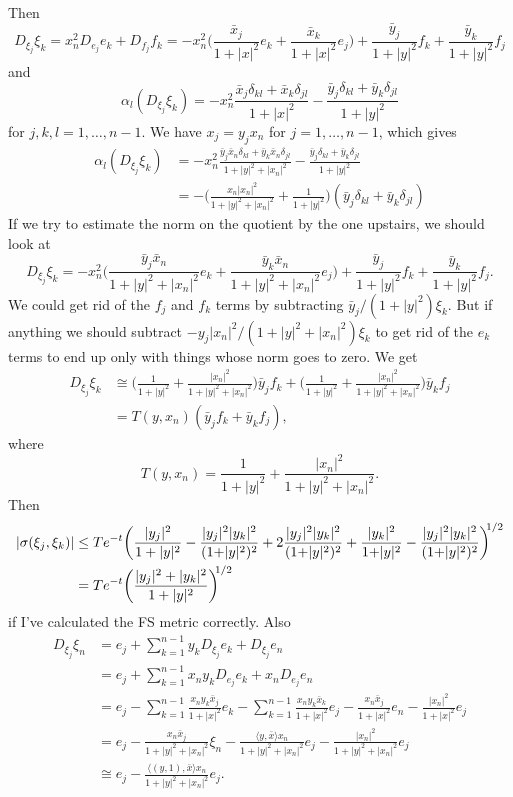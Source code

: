 \documentclass[10pt,a4paper]{amsart}
\def\<{\langle}
\def\>{\rangle}
\begin{document}
Then
$$
D_{\xi_j} \xi_k
= x_n^2 D_{e_j} e_k + D_{f_j} f_k
= -x_n^2
\biggl(
\frac{\bar x_j}{1+|x|^2} e_k
+ \frac{\bar x_k}{1+|x|^2} e_j
\biggr)
+ \frac{\bar y_j}{1+|y|^2} f_k + \frac{\bar y_k}{1+|y|^2} f_j
$$
and
$$
\alpha_l(D_{\xi_j}\xi_k)
= -x_n^2
\frac{\bar x_j \delta_{kl} + \bar x_k \delta_{jl}}{1+|x|^2}
- \frac{\bar y_j \delta_{kl} + \bar y_k \delta_{jl}}{1+|y|^2}
$$
for $j,k,l = 1, \ldots, n-1$.
We have $x_j = y_j x_n$ for $j=1,\ldots,n-1$, which gives
\begin{align*}
\alpha_l(D_{\xi_j}\xi_k)
&= -x_n^2
\frac{\bar y_j \bar x_n \delta_{kl} + \bar y_k \bar x_n \delta_{jl}}{1+|y|^2+|x_n|^2}
- \frac{\bar y_j \delta_{kl} + \bar y_k \delta_{jl}}{1+|y|^2}
\\
&= -
\biggl(
\frac{x_n |x_n|^2}{1+|y|^2+|x_n|^2}
+ \frac{1}{1+|y|^2}
\biggr)(\bar y_j \delta_{kl} + \bar y_k \delta_{jl})
\end{align*}
If we try to estimate the norm on the quotient by the one upstairs, we
should look at
$$
D_{\xi_j} \xi_k
=  -x_n^2
\biggl(
\frac{\bar y_j \bar x_n}{1+|y|^2+|x_n|^2} e_k
+ \frac{\bar y_k \bar x_n}{1+|y|^2+|x_n|^2} e_j
\biggr)
+ \frac{\bar y_j}{1+|y|^2} f_k + \frac{\bar y_k}{1+|y|^2} f_j.
$$
We could get rid of the $f_j$ and $f_k$ terms by subtracting $\bar y_j / (1+|y|^2) \xi_k$.
But if anything we should subtract $-y_j|x_n|^2/(1+|y|^2+|x_n|^2) \xi_k$ to get
rid of the $e_k$ terms to end up only with things whose norm goes to zero.
We get
\begin{align*}
D_{\xi_j} \xi_k
&\cong
\biggl(
\frac{1}{1+|y|^2}
+ \frac{|x_n|^2}{1+|y|^2+|x_n|^2}
\biggr)
\bar y_j f_k
+ \biggl(
\frac{1}{1+|y|^2}
+ \frac{|x_n|^2}{1+|y|^2+|x_n|^2}
\biggr)
\bar y_k
f_j
\\
&= T(y,x_n) (\bar y_j f_k + \bar y_k f_j),
\end{align*}
where
$$
T(y,x_n) =
\frac{1}{1+|y|^2}
+ \frac{|x_n|^2}{1+|y|^2+|x_n|^2}.
$$
Then
\begin{align*}
|\sigma(\xi_j,\xi_k)|
&\leq Te^{-t}\biggl(
\frac{|y_j|^2}{1+|y|^2}
- \frac{|y_j|^2|y_k|^2}{(1{+}|y|^2)^2}
+ 2\frac{|y_j|^2 |y_k|^2}{(1{+}|y|^2)^2}
+ \frac{|y_k|^2}{1{+}|y|^2}
- \frac{|y_j|^2|y_k|^2}{(1{+}|y|^2)^2}
\biggr)^{\mkern-6mu 1/2}
\\
&=
Te^{-t}\biggl(
\frac{|y_j|^2 + |y_k|^2}{1+|y|^2}
\biggr)^{\mkern-6mu 1/2}
\end{align*}
if I've calculated the FS metric correctly.
Also
\begin{align*}
D_{\xi_j} \xi_n
&= e_j
+ \sum_{k=1}^{n-1} y_k D_{\xi_j} e_k
+ D_{\xi_j} e_n
\\
&= e_j
+ \sum_{k=1}^{n-1} x_n y_k D_{e_j} e_k
+ x_n D_{e_j} e_n
\\
&= e_j
- \sum_{k=1}^{n-1}
\frac{x_n y_k \bar x_j}{1+|x|^2} e_k
- \sum_{k=1}^{n-1}
\frac{x_n y_k \bar x_k}{1+|x|^2} e_j
- \frac{x_n \bar x_j}{1+|x|^2} e_n
- \frac{|x_n|^2}{1+|x|^2} e_j
\\
&= e_j
- \frac{x_n\bar x_j}{1+|y|^2+|x_n|^2} \xi_n
- \frac{\<y, \bar x\> x_n}{1+|y|^2+|x_n|^2} e_j
- \frac{|x_n|^2}{1+|y|^2+|x_n|^2} e_j
\\
&\cong
e_j
- \frac{\<(y, 1), \bar x\> x_n}{1+|y|^2+|x_n|^2} e_j.
\end{align*}
\end{document}
